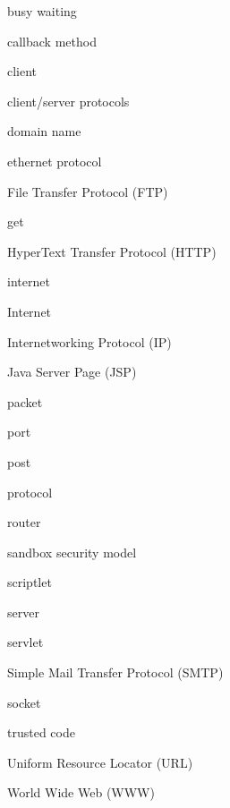 \label{chapter-summary}

\label{technical-terms}
\begin{KT}
busy waiting

callback method

client

client/server protocols

domain name

ethernet protocol

File Transfer Protocol (FTP)

get

HyperText Transfer Protocol (HTTP)

internet

Internet

Internetworking Protocol (IP)

Java Server Page (JSP)

packet

port

post

protocol

router

sandbox security model

scriptlet

server

servlet

Simple Mail Transfer Protocol (SMTP)

socket

trusted code

Uniform Resource Locator (URL)

World Wide Web (WWW)

\end{KT}



